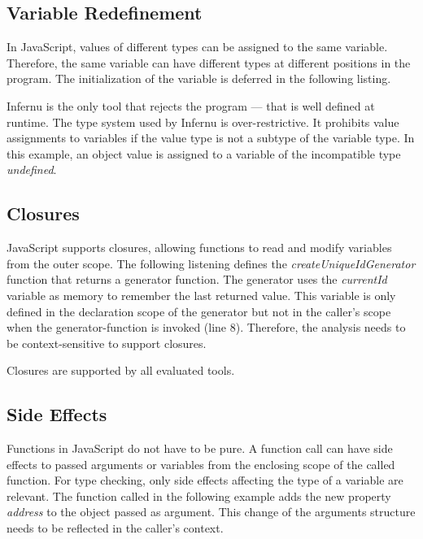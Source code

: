 \subsection{Variable Redefinement}\label{ssec:variable-redefinement}
In JavaScript, values of different types can be assigned to the same variable. Therefore, the same variable can have different types at different positions in the program. The initialization of the variable is deferred in the following listing.


Infernu is the only tool that rejects the program --- that is well defined at runtime. The type system used by Infernu is over-restrictive. It prohibits value assignments to variables if the value type is not a subtype of the variable type. In this example, an object value is assigned to a variable of the incompatible type \textit{undefined}.

\subsection{Closures}\label{ssec:closures}
JavaScript supports closures, allowing functions to read and modify variables from the outer scope. The following listening defines the \textit{createUniqueIdGenerator} function that returns a generator function. The generator uses the \textit{currentId} variable as memory to remember the last returned value. This variable is only defined in the declaration scope of the generator but not in the caller's scope when the generator-function is invoked (line 8). Therefore, the analysis needs to be context-sensitive to support closures.


Closures are supported by all evaluated tools.

\subsection{Side Effects}\label{ssec:side-effects}
Functions in JavaScript do not have to be pure. A function call can have side effects to passed arguments or variables from the enclosing scope of the called function. For type checking, only side effects affecting the type of a variable are relevant. The function called in the following example adds the new property \textit{address} to the object passed as argument. This change of the arguments structure needs to be reflected in the caller's context.

